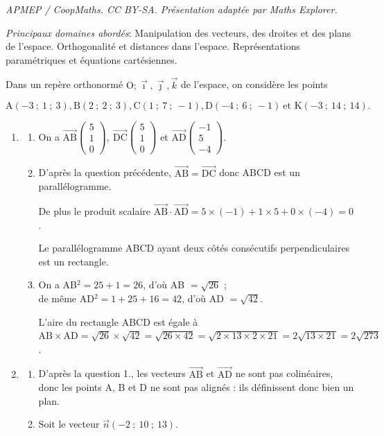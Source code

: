 \documentclass[10pt]{article}
\providecommand{\vect}[1]{\overrightarrow{#1}}
\providecommand{\vectt}[1]{\overrightarrow{\mathrm{#1}}}
\providecommand{\Oijk}{\(\mathrm{O};\vec{\imath},\vec{\jmath},\vec{k}\)}
\begin{document}
\noindent\textit{APMEP / CoopMaths. CC BY-SA. Présentation adaptée par Maths Explorer.}\par\medskip
\medskip

\emph{Principaux domaines abordés}: Manipulation des vecteurs, des droites et des plans de l'espace. Orthogonalité et distances dans l'espace.
Représentations paramétriques et équations cartésiennes.

\bigskip

Dans un repère orthonormé \Oijk{} de l'espace,
on considère les points 

\[\text{A}(-3~;~1~;~3), \text{B}(2~;~2~;~3), \text{C}(1~;~7~;~-1), \text{D}(-4~;~6~;~-1)\: \text{et 
K}(-3~;~14~;~14).\]



\begin{enumerate}
\item 
	\begin{enumerate}
		\item 
On a $\vect{\text{AB}}\begin{pmatrix}5\\1\\0\end{pmatrix}, \: \vect{\text{DC}}\begin{pmatrix}5\\1\\0\end{pmatrix}$ et $\vect{\text{AD}}\begin{pmatrix}-1\\5\\-4\end{pmatrix}$.
		\item
D'après la question précédente, $\vectt{AB}=\vectt{DC}$ donc ABCD est un parallélogramme.

De plus le produit scalaire $\vect{\text{AB}} \cdot \vect{\text{AD}} = 5\times(-1) + 1\times 5 + 0\times(-4) = 0$.

Le parallélogramme ABCD ayant deux côtés consécutifs perpendiculaires est un rectangle.

		\item 
On a AB$^2 = 25 + 1 = 26$, d'où AB $= \sqrt{26}$ ; \\
de même AD$^2 =  1  + 25 + 16= 42$, d'où AD $= \sqrt{42}$.

L'aire du rectangle ABCD est égale à \\
$\text{AB} \times \text{AD} = \sqrt{26 }\times\sqrt{42} = \sqrt{26 \times 42} = \sqrt{2 \times 13 \times 2 \times 21} = 2\sqrt{13 \times 21} = 2\sqrt{273}$.
	\end{enumerate}
\item 
	\begin{enumerate}
		\item 
D'après la question 1., les vecteurs $\vect{\text{AB}}$ et $\vect{\text{AD}}$ ne sont pas colinéaires, donc les points A, B et D ne sont pas alignés : ils définissent donc bien un plan.
		\item Soit le vecteur $\vect{n}(-2~;~10~;~13)$.
		

\end{enumerate}
\end{enumerate}
\end{document}
